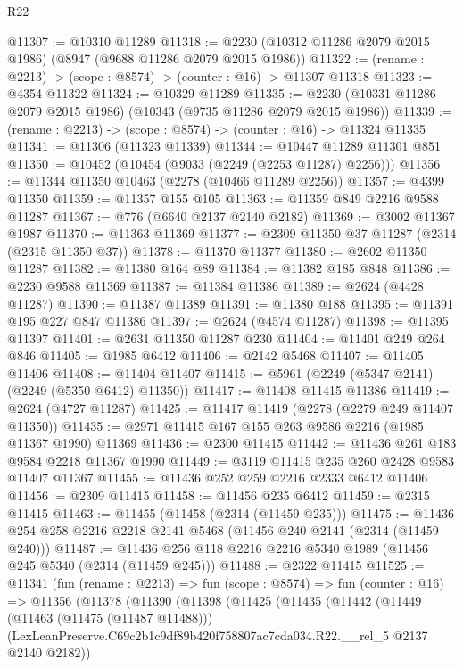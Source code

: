 \begin{lexlean}{R22}
\begin{coremodule}
@11307 := @10310 @11289
@11318 := @2230 (@10312 @11286 @2079 @2015 @1986) (@8947 (@9688 @11286 @2079 @2015 @1986))
@11322 := (rename : @2213) -> (scope : @8574) -> (counter : @16) -> @11307 @11318
@11323 := @4354 @11322
@11324 := @10329 @11289
@11335 := @2230 (@10331 @11286 @2079 @2015 @1986) (@10343 (@9735 @11286 @2079 @2015 @1986))
@11339 := (rename : @2213) -> (scope : @8574) -> (counter : @16) -> @11324 @11335
@11341 := @11306 (@11323 @11339)
@11344 := @10447 @11289 @11301 @851
@11350 := @10452 (@10454 (@9033 (@2249 (@2253 @11287) @2256)))
@11356 := @11344 @11350 @10463 (@2278 (@10466 @11289 @2256))
@11357 := @4399 @11350
@11359 := @11357 @155 @105
@11363 := @11359 @849 @2216 @9588 @11287
@11367 := @776 (@6640 @2137 @2140 @2182)
@11369 := @3002 @11367 @1987
@11370 := @11363 @11369
@11377 := @2309 @11350 @37 @11287 (@2314 (@2315 @11350 @37))
@11378 := @11370 @11377
@11380 := @2602 @11350 @11287
@11382 := @11380 @164 @89
@11384 := @11382 @185 @848
@11386 := @2230 @9588 @11369
@11387 := @11384 @11386
@11389 := @2624 (@4428 @11287)
@11390 := @11387 @11389
@11391 := @11380 @188
@11395 := @11391 @195 @227 @847 @11386
@11397 := @2624 (@4574 @11287)
@11398 := @11395 @11397
@11401 := @2631 @11350 @11287 @230
@11404 := @11401 @249 @264 @846
@11405 := @1985 @6412
@11406 := @2142 @5468
@11407 := @11405 @11406
@11408 := @11404 @11407
@11415 := @5961 (@2249 (@5347 @2141) (@2249 (@5350 @6412) @11350))
@11417 := @11408 @11415 @11386
@11419 := @2624 (@4727 @11287)
@11425 := @11417 @11419 (@2278 (@2279 @249 @11407 @11350))
@11435 := @2971 @11415 @167 @155 @263 @9586 @2216 (@1985 @11367 @1990) @11369
@11436 := @2300 @11415
@11442 := @11436 @261 @183 @9584 @2218 @11367 @1990
@11449 := @3119 @11415 @235 @260 @2428 @9583 @11407 @11367
@11455 := @11436 @252 @259 @2216 @2333 @6412 @11406
@11456 := @2309 @11415
@11458 := @11456 @235 @6412
@11459 := @2315 @11415
@11463 := @11455 (@11458 (@2314 (@11459 @235)))
@11475 := @11436 @254 @258 @2216 @2218 @2141 @5468 (@11456 @240 @2141 (@2314 (@11459 @240)))
@11487 := @11436 @256 @118 @2216 @2216 @5340 @1989 (@11456 @245 @5340 (@2314 (@11459 @245)))
@11488 := @2322 @11415
@11525 := @11341
    (fun (rename : @2213) =>
    fun (scope : @8574) =>
    fun (counter : @16) =>
    @11356
      (@11378
        (@11390
          (@11398
            (@11425
              (@11435
                (@11442
                  (@11449
                    (@11463 (@11475 (@11487 @11488)))
                    (LexLeanPreserve.C69c2b1c9df89b420f758807ac7cda034.R22.__rel_5
                      @2137
                      @2140
                      @2182))

\end{coremodule}
\end{lexlean}
